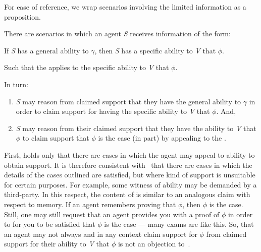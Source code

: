 \begin{note}
  For ease of reference, we wrap scenarios involving the limited information as a proposition.
  \begin{proposition}[\eA{-} --- \eA{}]\label{prem:ab}
    There are scenarios in which an agent \emph{S} receives \gsi{} information of the form:
    \begin{center}
      If \emph{S} has a general ability to \(\gamma\), then \emph{S} has a specific ability to \emph{V} that \(\phi\).
    \end{center}

    \noindent Such that the \aben{} applies to the specific ability to \emph{V} that \(\phi\).

    In turn:
    \begin{enumerate}
    \item \emph{S} may reason from claimed support that they have the general ability to \(\gamma\) in order to claim support for having the specific ability to \emph{V} that \(\phi\). And,
    \item \emph{S} may reason from their claimed support that they have the ability to \emph{V} that \(\phi\) to claim support that \(\phi\) is the case (in part) by appealing to the \aben{}.
    \end{enumerate}
    \vspace{-\topsep}\vspace{-\topsep}
  \end{proposition}
\end{note}

\begin{note}
  First, \eA{} holds only that there are cases in which the agent may appeal to ability to obtain support.
  It is therefore consistent with~\eA{} that there are cases in which the details of the cases outlined are satisfied, but where kind of support is unsuitable for certain purposes.
  For example, some witness of ability may be demanded by a third-party.
  In this respect, the content of \eA{} is similar to an analogous claim with respect to memory.
  If an agent remembers proving that \(\phi\), then \(\phi\) is the case.
  Still, one may still request that an agent provides you with a proof of \(\phi\) in order to for you to be satisfied that \(\phi\) is the case --- many exams are like this.
  So, that an agent may not always and in any context claim support for \(\phi\) from claimed support for their ability to \emph{V} that \(\phi\) is not an objection to~\eA{}.
\end{note}

